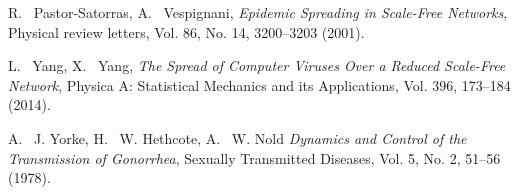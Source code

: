 \documentclass{uonmathsreport}
\begin{document}
\begin{thebibliography}{99}
R. ~Pastor-Satorras, A. ~Vespignani,
{\it Epidemic Spreading in Scale-Free Networks\/},
Physical review letters,
 Vol. 86, No. 14, 3200--3203
(2001).

L. ~Yang, X. ~Yang,
{\it The Spread of Computer Viruses Over a Reduced Scale-Free Network\/},
Physica A: Statistical Mechanics and its Applications,
 Vol. 396, 173--184
(2014).

A. ~J. Yorke, H. ~W. Hethcote, A. ~W. Nold
{\it Dynamics and Control of the Transmission of Gonorrhea\/},
Sexually Transmitted Diseases,
 Vol. 5, No. 2, 51--56
(1978).


\end{thebibliography}
\end{document}

